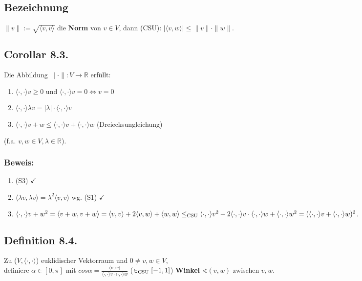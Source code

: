 \documentclass[a4paper, 12pt]{extarticle}
\newcommand{\skalar}[2] {
	\langle #1, #2\rangle
}
\newcommand{\genskalar}{
	\skalar{\cdot }{\cdot }
}
\newcommand{\tn}[1]{\textnormal {#1}}
\begin{document}
\subsection*{Bezeichnung}
$\parallel v \parallel := \sqrt{\skalar{v}{v}}$ die \textbf{Norm} von $v \in V$, dann (CSU): $|\skalar{v}{w}| \leq \parallel v\parallel \cdot \parallel w\parallel$.
\subsection*{Corollar 8.3.}
Die Abbildung $\parallel \cdot \parallel: V \longrightarrow \mathbb{R}$ erfüllt:
\begin{enumerate}[label=\alph*)]
	\item $\genskalar{v} \geq 0$ und $\genskalar{v} = 0 \Leftrightarrow v = 0$
	\item $\genskalar{\lambda v} = |\lambda|\cdot \genskalar{v}$
	\item $\genskalar{v+w} \leq \genskalar{v}+\genskalar{w}$ (Dreiecksungleichung)
\end{enumerate}
(f.a. $v, w \in V, \lambda \in \mathbb{R}$).
\subsubsection*{Beweis:}
\begin{enumerate}[label=\alph*)]
	\item (S3) $\checkmark$
	\item ${\skalar{\lambda v}{\lambda v}} = \lambda^2{\skalar{v}{v}}$ wg. (S1) $\checkmark$
	\item $\genskalar{v+w}^2 = {\skalar{v+w}{v+w}} = {\skalar{v}{v}}+2{\skalar{v}{w}}+{\skalar{w}{w}}\\ \leq_{\tn{CSU}} \genskalar{v}^2 + 2\genskalar{v}\cdot\genskalar{w}+\genskalar{w}^2 = (\genskalar{v}+\genskalar{w})^2$.
\end{enumerate}

\subsection*{Definition 8.4.}
Zu ($V, \genskalar$) euklidischer Vektorraum und $0 \neq v, w \in V$,\\ definiere $\alpha \in [0, \pi]$ mit $cos \alpha = \frac{\skalar{v}{w}}{\genskalar{v}\cdot\genskalar{w}}$ ($\in_{\tn{CSU}} [-1, 1]$)
\textbf{Winkel} $\sphericalangle(v, w)$ zwischen $v, w$.
\newpage
\end{document}

